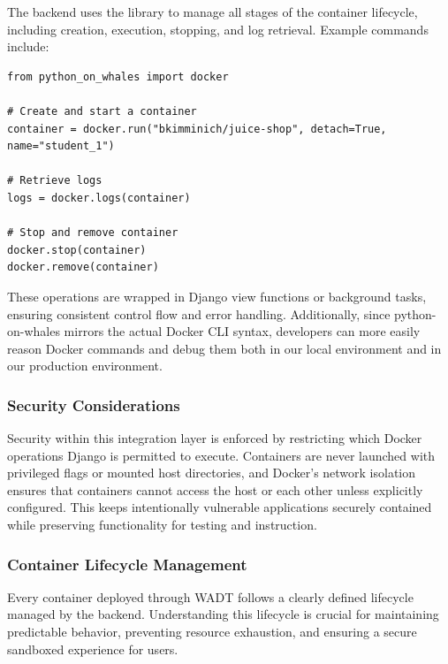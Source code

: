 \documentclass[12pt]{article}
\begin{document}
The backend uses the library to manage all stages of the container lifecycle, including creation, execution, stopping, and log retrieval. Example commands include:
\begin{verbatim}
from python_on_whales import docker

# Create and start a container
container = docker.run("bkimminich/juice-shop", detach=True, name="student_1")

# Retrieve logs
logs = docker.logs(container)

# Stop and remove container
docker.stop(container)
docker.remove(container)
\end{verbatim}

These operations are wrapped in Django view functions or background tasks, ensuring consistent control flow and error handling. Additionally, since python-on-whales mirrors the actual Docker CLI syntax, developers can more easily reason Docker commands and debug them both in our local environment and in our production environment.

\subsubsection{Security Considerations}
Security within this integration layer is enforced by restricting which Docker operations Django is permitted to execute. Containers are never launched with privileged flags or mounted host directories, and Docker’s network isolation ensures that containers cannot access the host or each other unless explicitly configured. This keeps intentionally vulnerable applications securely contained while preserving functionality for testing and instruction.

\subsubsection{Container Lifecycle Management}
Every container deployed through WADT follows a clearly defined lifecycle managed by the backend. Understanding this lifecycle is crucial for maintaining predictable behavior, preventing resource exhaustion, and ensuring a secure sandboxed experience for users.
\end{document}
